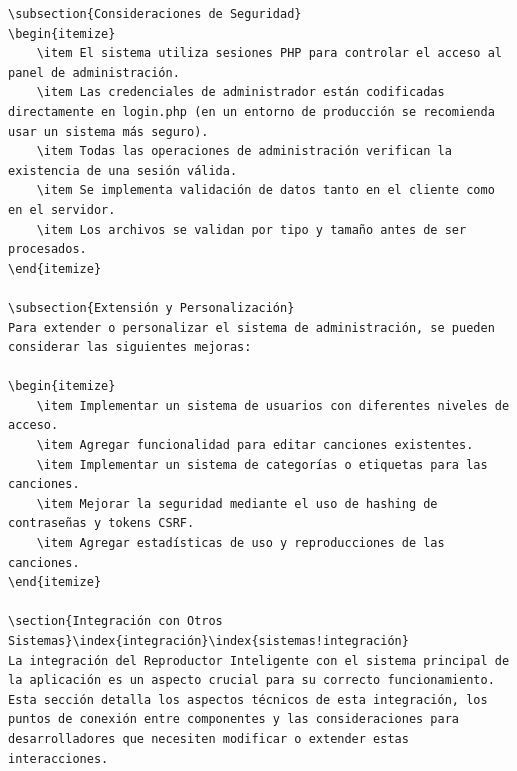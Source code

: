 \documentclass[a4paper,12pt]{article}
\begin{document}
\begin{itemize}
\begin{verbatim}
\subsection{Consideraciones de Seguridad}
\begin{itemize}
    \item El sistema utiliza sesiones PHP para controlar el acceso al panel de administración.
    \item Las credenciales de administrador están codificadas directamente en login.php (en un entorno de producción se recomienda usar un sistema más seguro).
    \item Todas las operaciones de administración verifican la existencia de una sesión válida.
    \item Se implementa validación de datos tanto en el cliente como en el servidor.
    \item Los archivos se validan por tipo y tamaño antes de ser procesados.
\end{itemize}

\subsection{Extensión y Personalización}
Para extender o personalizar el sistema de administración, se pueden considerar las siguientes mejoras:

\begin{itemize}
    \item Implementar un sistema de usuarios con diferentes niveles de acceso.
    \item Agregar funcionalidad para editar canciones existentes.
    \item Implementar un sistema de categorías o etiquetas para las canciones.
    \item Mejorar la seguridad mediante el uso de hashing de contraseñas y tokens CSRF.
    \item Agregar estadísticas de uso y reproducciones de las canciones.
\end{itemize}

\section{Integración con Otros Sistemas}\index{integración}\index{sistemas!integración}
La integración del Reproductor Inteligente con el sistema principal de la aplicación es un aspecto crucial para su correcto funcionamiento. Esta sección detalla los aspectos técnicos de esta integración, los puntos de conexión entre componentes y las consideraciones para desarrolladores que necesiten modificar o extender estas interacciones.


\end{verbatim}
\end{itemize}
\end{document}
